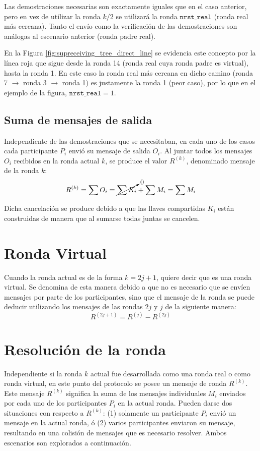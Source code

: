 Las demostraciones necesarias son exactamente iguales que en el caso anterior, 
pero en vez de utilizar la ronda $k/2$ se utilizará la ronda $\mathtt{nrst\_real}$ 
(ronda real más cercana). Tanto el envío como la verificación de las demostraciones 
son análogas al escenario anterior (ronda padre real).

En la Figura \ref{fig:supreceiving_tree_direct_line} 
se evidencia este concepto por la línea roja que sigue desde la ronda 14 (ronda real cuya 
ronda padre es virtual), hasta la ronda 1. En este caso la ronda real más cercana en dicho camino 
(ronda 7 $\to$ ronda 3 $\to$ ronda 1) es justamente la ronda 1 (peor caso), 
por lo que en el ejemplo de la figura, $\mathtt{nrst\_real} = 1$. 

\subsection{Suma de mensajes de salida}

Independiente de las demostraciones que se necesitaban, en cada uno de los casos 
cada participante $P_i$ envió su mensaje de salida $O_i$. Al juntar todos los 
mensajes $O_i$ recibidos en la ronda actual $k$, se produce el valor $R^{(k)}$, 
denominado mensaje de la ronda 
$k$: $$R^{(k)} = \sum O_i = \cancelto{0}{\sum K_i} + \sum M_i = \sum M_i$$

Dicha cancelación se produce debido a que las llaves compartidas $K_i$ están 
construidas de manera que al sumarse todas juntas se cancelen.

\section{Ronda Virtual}

Cuando la ronda actual es de la forma $k = 2j + 1$, quiere decir que es una ronda 
virtual. Se denomina de esta manera debido a que no es necesario que se envíen 
mensajes por parte de los participantes, sino que el mensaje de la ronda se puede 
deducir utilizando los mensajes de las rondas $2j$ y $j$ de la siguiente manera: 
$$R^{(2j + 1)} = R^{(j)} - R^{(2j)}$$

\section{Resolución de la ronda}

Independiente si la ronda $k$ actual fue desarrollada como una ronda real o como 
ronda virtual, en este punto del protocolo se posee un mensaje de ronda $R^{(k)}$. 
Este mensaje $R^{(k)}$ significa la suma de los mensajes individuales $M_i$ 
enviados por cada uno de los participantes $P_i$ en la actual ronda. Pueden darse 
dos situaciones con respecto a $R^{(k)}$: (1) solamente un participante $P_i$ envió 
un mensaje en la actual ronda, ó (2) varios participantes enviaron su mensaje, 
resultando en una colisión de mensajes que es necesario resolver. Ambos escenarios 
son explorados a continuación.


